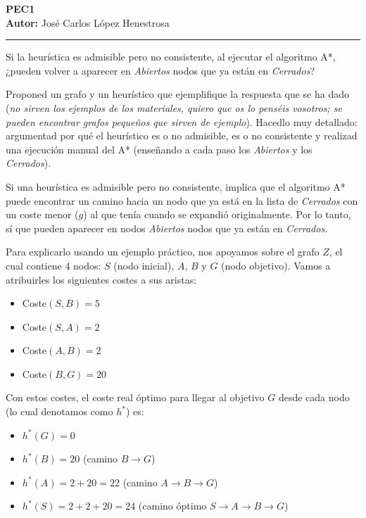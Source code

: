 \documentclass[11pt, a4paper]{article}
\newenvironment{problem}[1][Cuestión]{
	\vspace{0.5cm}
	\noindent{\Large\bfseries #1} \par\vspace{0.5cm}
}{
	\vspace{0.5cm}
}
\begin{document}
	\begin{center}
		\Large{ \textbf{PEC1} } \\
		\vspace{0.5cm}
		\normalsize{\textbf{Autor:} José Carlos López Henestrosa}
	\end{center}

	\vspace{1cm}
	\hrule
	\vspace{1cm}

	\begin{problem}[Cuestión 1 (20\%)]
		Si la heurística es admisible pero no consistente, al ejecutar el algoritmo A*, ¿pueden volver a aparecer en \textit{Abiertos} nodos que ya están en \textit{Cerrados}? 

		Proponed un grafo y un heurístico que ejemplifique la respuesta que se ha dado (\textit{no sirven los ejemplos de los materiales, quiero que os lo penséis vosotros; se pueden encontrar grafos pequeños que sirven de ejemplo}). Hacedlo muy detallado: argumentad por qué el heurístico es o no admisible, es o no consistente y realizad una ejecución manual del A* (enseñando a cada paso los \textit{Abiertos} y los \textit{Cerrados}).

		{ \color{blue} 
			Si una heurística es admisible pero no consistente, implica que el algoritmo A* puede encontrar un camino hacia un nodo que ya está en la lista de \textit{Cerrados} con un coste menor ($g$) al que tenía cuando se expandió originalmente. Por lo tanto, sí que pueden aparecer en nodos \textit{Abiertos} nodos que ya están en \textit{Cerrados}. 

			Para explicarlo usando un ejemplo práctico, nos apoyamos sobre el grafo $Z$, el cual contiene 4 nodos: $S$ (nodo inicial), $A$, $B$ y $G$ (nodo objetivo). Vamos a atribuirles los siguientes costes a sus aristas:

			\begin{itemize}
				\item Coste$(S,B) = 5$
				\item Coste$(S,A) = 2$
				\item Coste$(A,B) = 2$
				\item Coste$(B,G) = 20$
			\end{itemize}

			Con estos costes, el coste real óptimo para llegar al objetivo $G$ desde cada nodo (lo cual denotamos como $h^*$) es:

			\begin{itemize}
				\item $h^*(G) = 0$
				\item $h^*(B) = 20$ (camino $B \to G$) 
				\item $h^*(A) = 2 + 20 = 22$ (camino $A \to B \to G$)
				\item $h^*(S) = 2 + 2 + 20 = 24$ (camino óptimo $S \to A \to B \to G$)
			\end{itemize}

}
\end{problem}
\end{document}
